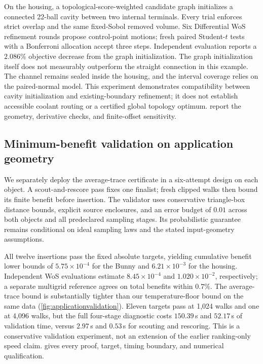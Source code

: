 On the housing, a topological-score-weighted candidate graph initializes a connected 22-ball cavity between two internal terminals. Every trial enforces strict overlap and the same fixed-Sobol removed volume. Six Differential WoS refinement rounds propose control-point motions; fresh paired Student-$t$ tests with a Bonferroni allocation accept three steps. Independent evaluation reports a $2.086\%$ objective decrease from the graph initialization. The graph initialization itself does not measurably outperform the straight connection in this example. The channel remains sealed inside the housing, and the interval coverage relies on the paired-normal model. This experiment demonstrates compatibility between cavity initialization and existing-boundary refinement; it does not establish accessible coolant routing or a certified global topology optimum.  report the geometry, derivative checks, and finite-offset sensitivity.

\subsection{Minimum-benefit validation on application geometry}
\label{sec:applicationvalidation}

We separately deploy the average-trace certificate in a six-attempt design
on each object. A scout-and-rescore pass fixes one finalist; fresh clipped
walks then bound its finite benefit before insertion. The validator uses
conservative triangle-box distance bounds, explicit source enclosures, and
an error budget of $0.01$ across both objects and all predeclared sampling
stages. Its probabilistic guarantee remains conditional on ideal sampling
laws and the stated input-geometry assumptions.

All twelve insertions pass the fixed absolute targets, yielding cumulative
benefit lower bounds of $5.75\times10^{-4}$ for the Bunny and
$6.21\times10^{-3}$ for the housing. Independent WoS evaluations estimate
$8.45\times10^{-4}$ and $1.020\times10^{-2}$, respectively; a separate
multigrid reference agrees on total benefits within $0.7\%$. The
average-trace bound is substantially tighter than our temperature-floor
bound on the same data (\cref{fig:applicationvalidation}). Eleven targets pass
at 1,024 walks and one at 4,096 walks, but the full four-stage diagnostic costs
$150.39$\,s and $52.17$\,s of validation time, versus $2.97$\,s and
$0.53$\,s for scouting and rescoring. This is a conservative validation
experiment, not an extension of the earlier ranking-only speed claim.
 gives every proof, target, timing boundary,
and numerical qualification.

